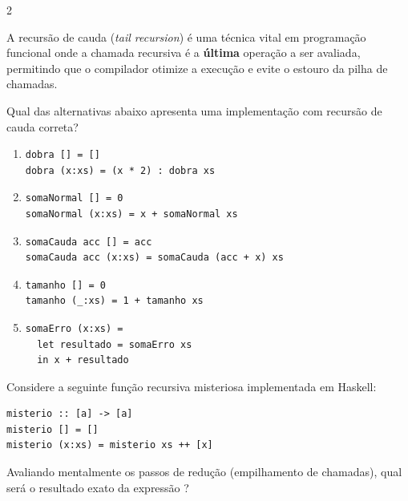 \documentclass[a4paper,10pt,brazil]{article}
\begin{document}
\begin{multicols}{2}
\begin{enumerate}
\end{enumerate}

A recursão de cauda (\emph{tail recursion}) é uma técnica vital em programação funcional onde a chamada recursiva é a \textbf{última} operação a ser avaliada, permitindo que o compilador otimize a execução e evite o estouro da pilha de chamadas. 

Qual das alternativas abaixo apresenta uma implementação com recursão de cauda correta?

\begin{enumerate}
  \item \begin{verbatim}
dobra [] = []
dobra (x:xs) = (x * 2) : dobra xs
\end{verbatim}

  \item \begin{verbatim}
somaNormal [] = 0
somaNormal (x:xs) = x + somaNormal xs
\end{verbatim}

  \item \begin{verbatim}
somaCauda acc [] = acc
somaCauda acc (x:xs) = somaCauda (acc + x) xs
\end{verbatim}

  \item \begin{verbatim}
tamanho [] = 0
tamanho (_:xs) = 1 + tamanho xs
\end{verbatim}

  \item \begin{verbatim}
somaErro (x:xs) = 
  let resultado = somaErro xs 
  in x + resultado
\end{verbatim}


\end{enumerate}

Considere a seguinte função recursiva misteriosa implementada em Haskell:

\begin{verbatim}
misterio :: [a] -> [a]
misterio [] = []
misterio (x:xs) = misterio xs ++ [x]
\end{verbatim}

Avaliando mentalmente os passos de redução (empilhamento de chamadas), qual será o resultado exato da expressão ?


\end{multicols}
\end{document}
